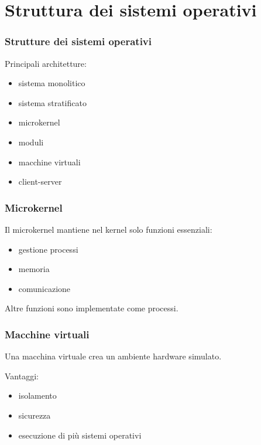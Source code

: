 \documentclass{beamer}
\begin{document}
	\section{Struttura dei sistemi operativi}
	
	\begin{frame}
		\frametitle{Strutture dei sistemi operativi}
		
		Principali architetture:
		
		\begin{itemize}
			\item sistema monolitico
			\item sistema stratificato
			\item microkernel
			\item moduli
			\item macchine virtuali
			\item client-server
		\end{itemize}
		
	\end{frame}
	
	
	\begin{frame}
		\frametitle{Microkernel}
		
		Il microkernel mantiene nel kernel solo funzioni essenziali:
		
		\begin{itemize}
			\item gestione processi
			\item memoria
			\item comunicazione
		\end{itemize}
		
		Altre funzioni sono implementate come processi.
		
	\end{frame}
	
	
	\begin{frame}
		\frametitle{Macchine virtuali}
		
		Una macchina virtuale crea un ambiente hardware simulato.
		
		Vantaggi:
		
		\begin{itemize}
			\item isolamento
			\item sicurezza
			\item esecuzione di più sistemi operativi
		\end{itemize}
		
	\end{frame}
	
\end{document}
